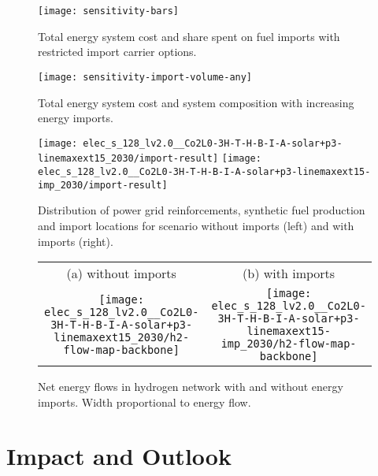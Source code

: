 \documentclass[10pt,5p,reversenotenum,lefttitle]{elsarticle}
\begin{document}
\begin{figure}
    \centering
    \texttt{[image: sensitivity-bars]}
    \caption{Total energy system cost and share spent on fuel imports with restricted import carrier options.}
    \label{fig:sensitivity-bars}
\end{figure}

\begin{figure*}
    \centering
    \texttt{[image: sensitivity-import-volume-any]}
    \vspace{-0.3cm}
    \caption{Total energy system cost and system composition with increasing energy imports.}
    \label{fig:sensitivity-import-volume-any}
\end{figure*}

\begin{figure*}
    \centering
    \texttt{[image: elec\_s\_128\_lv2.0\_\_Co2L0-3H-T-H-B-I-A-solar+p3-linemaxext15\_2030/import-result]}
    \texttt{[image: elec\_s\_128\_lv2.0\_\_Co2L0-3H-T-H-B-I-A-solar+p3-linemaxext15-imp\_2030/import-result]}
    \caption{Distribution of power grid reinforcements, synthetic fuel production and import locations for scenario without imports (left) and with imports (right).}
    \label{fig:import-result}
\end{figure*}

\begin{figure*}
    \centering\small
    \begin{tabular}{cc}
        (a) without imports & (b) with imports \\
        \texttt{[image: elec\_s\_128\_lv2.0\_\_Co2L0-3H-T-H-B-I-A-solar+p3-linemaxext15\_2030/h2-flow-map-backbone]} &
        \texttt{[image: elec\_s\_128\_lv2.0\_\_Co2L0-3H-T-H-B-I-A-solar+p3-linemaxext15-imp\_2030/h2-flow-map-backbone]}
    \end{tabular}
    \caption{Net energy flows in hydrogen network with and without energy imports. Width proportional to energy flow.}
    \label{fig:hydrogen-flows}
\end{figure*}



\section*{Impact and Outlook}
\end{document}
